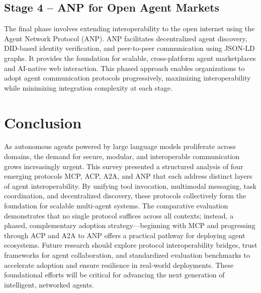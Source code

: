 \documentclass{article}
\begin{document}
\subsection{Stage 4 – ANP for Open Agent Markets}
The final phase involves extending interoperability to the open internet using the Agent Network Protocol (ANP). ANP facilitates decentralized agent discovery, DID-based identity verification, and peer-to-peer communication using JSON-LD graphs. It provides the foundation for scalable, cross-platform agent marketplaces and AI-native web interaction. This phased approach enables organizations to adopt agent communication protocols progressively, maximizing interoperability while minimizing integration complexity at each stage.

\section{Conclusion}

As autonomous agents powered by large language models proliferate across domains, the demand for secure, modular, and interoperable communication grows increasingly urgent. This survey presented a structured analysis of four emerging protocols MCP, ACP, A2A, and ANP that each address distinct layers of agent interoperability. By unifying tool invocation, multimodal messaging, task coordination, and decentralized discovery, these protocols collectively form the foundation for scalable multi-agent systems. The comparative evaluation demonstrates that no single protocol suffices across all contexts; instead, a phased, complementary adoption strategy—beginning with MCP and progressing through ACP and A2A to ANP offers a practical pathway for deploying agent ecosystems. Future research should explore protocol interoperability bridges, trust frameworks for agent collaboration, and standardized evaluation benchmarks to accelerate adoption and ensure resilience in real-world deployments. These foundational efforts will be critical for advancing the next generation of intelligent, networked agents.




  
  
\end{document}
